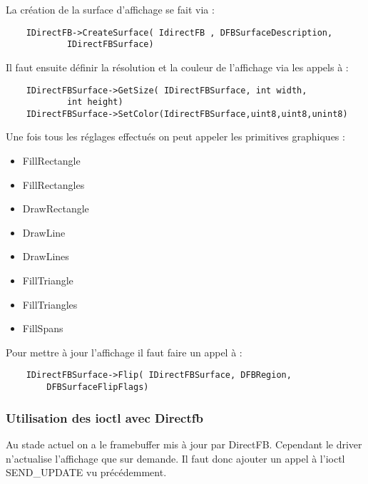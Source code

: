 La création de la surface d'affichage se fait via : 
	\begin{lstlisting}
	IDirectFB->CreateSurface( IdirectFB , DFBSurfaceDescription, 
			IDirectFBSurface)
	\end{lstlisting}

Il faut ensuite définir la résolution et la couleur de l'affichage via les appels à :
	\begin{lstlisting}
	IDirectFBSurface->GetSize( IDirectFBSurface, int width, 
			int height)
	IDirectFBSurface->SetColor(IdirectFBSurface,uint8,uint8,unint8)
	\end{lstlisting}

Une fois tous les réglages effectués on peut appeler les primitives graphiques : 
\begin{itemize}
	\item FillRectangle
	\item FillRectangles
	\item DrawRectangle
	\item DrawLine
	\item DrawLines
	\item FillTriangle
	\item FillTriangles
	\item FillSpans
\end{itemize}

Pour mettre à jour l'affichage il faut faire un appel à : 
	\begin{lstlisting}
	IDirectFBSurface->Flip( IDirectFBSurface, DFBRegion,
		DFBSurfaceFlipFlags)
	\end{lstlisting}




\subsubsection{Utilisation des ioctl avec Directfb}

Au stade actuel on a le framebuffer mis à jour par DirectFB. Cependant le driver n'actualise l'affichage que sur demande.
Il faut donc ajouter un appel à l'ioctl SEND_UPDATE vu précédemment.

